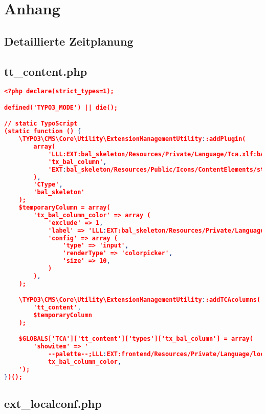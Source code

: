 \section{Anhang}
\subsection{Detaillierte Zeitplanung}
\label{app:Zeitplanung}


\subsection{tt\_content.php}
\label{tt_content.php}

\begin{lstlisting}[language=json,firstnumber=1]
<?php declare(strict_types=1);

defined('TYPO3_MODE') || die();

// static TypoScript
(static function () {
    \TYPO3\CMS\Core\Utility\ExtensionManagementUtility::addPlugin(
        array(
            'LLL:EXT:bal_skeleton/Resources/Private/Language/Tca.xlf:bal_column.wizard.title',
            'tx_bal_column',
            'EXT:bal_skeleton/Resources/Public/Icons/ContentElements/stage.png'
        ),
        'CType',
        'bal_skeleton'
    );
    $temporaryColumn = array(
        'tx_bal_column_color' => array (
            'exclude' => 1,
            'label' => 'LLL:EXT:bal_skeleton/Resources/Private/Language/Tca.xlf:bal_column.color.title',
            'config' => array (
                'type' => 'input',
                'renderType' => 'colorpicker',
                'size' => 10,
            )
        ),
    );

    \TYPO3\CMS\Core\Utility\ExtensionManagementUtility::addTCAcolumns(
        'tt_content',
        $temporaryColumn
    );

    $GLOBALS['TCA']['tt_content']['types']['tx_bal_column'] = array(
        'showitem' => '
            --palette--;LLL:EXT:frontend/Resources/Private/Language/locallang_ttc.xml:palette.general;general,
            tx_bal_column_color,
    ');
})();
\end{lstlisting}

\subsection{ext\_localconf.php}
\label{ext_localconf.php}

